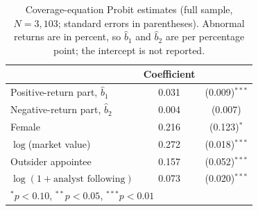 \begin{table}[t]
\centering
\caption{Coverage-equation Probit estimates (full sample, $N=3{,}103$; standard errors in parentheses). Abnormal returns are in percent, so $\hat b_1$ and $\hat b_2$ are per percentage point; the intercept is not reported.}
\label{tab:realprobit}
\begin{tabular}{lcc}
\toprule
& Coefficient & \\
\midrule
Positive-return part, $\hat b_1$ & 0.031 & (0.009)$^{***}$ \\
Negative-return part, $\hat b_2$ & 0.004 & (0.007) \\
Female & 0.216 & (0.123)$^{*}$ \\
$\log$(market value) & 0.272 & (0.018)$^{***}$ \\
Outsider appointee & 0.157 & (0.052)$^{***}$ \\
$\log(1+\text{analyst following})$ & 0.073 & (0.020)$^{***}$ \\
\bottomrule
\multicolumn{3}{l}{\footnotesize $^{*}p<0.10$, $^{**}p<0.05$, $^{***}p<0.01$} \\
\end{tabular}
\end{table}
